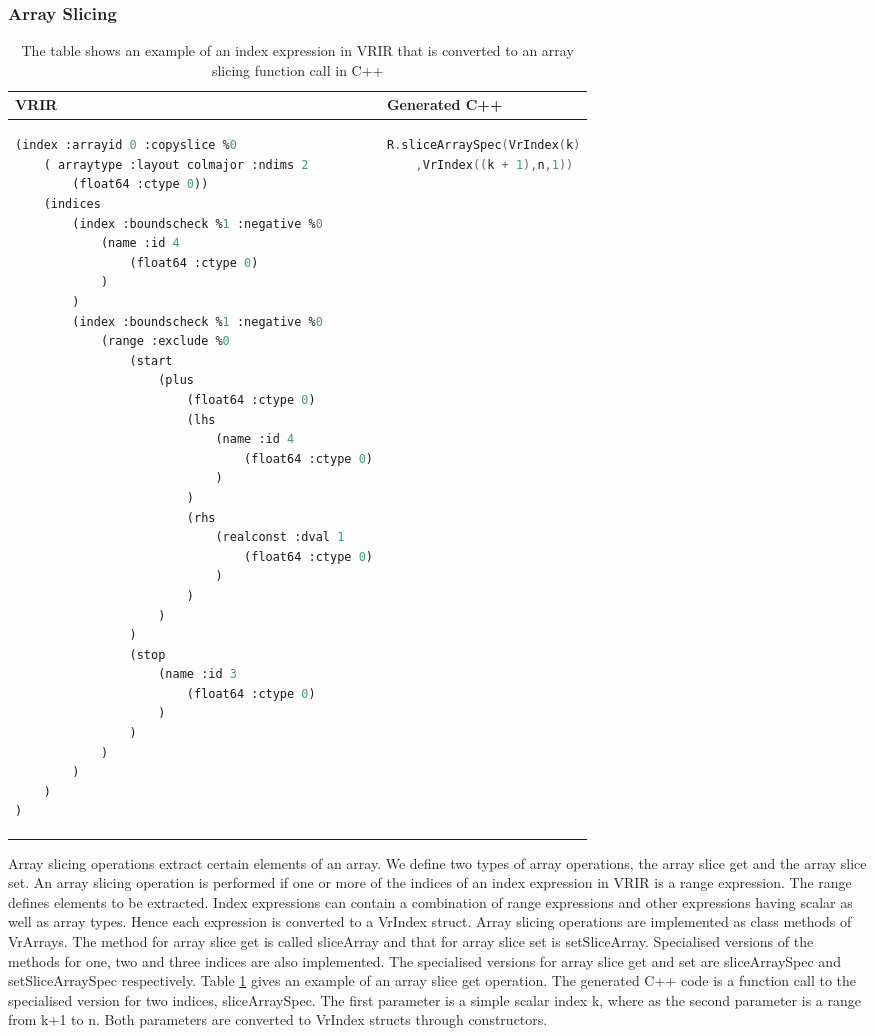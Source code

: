 \subsubsection{Array Slicing}
\label{subsubsec:slicing}
\begin{table}[htbp]
\centering
\begin{tabular}{|l|l|}
\hline

VRIR &  Generated C++ \\
\hline
{
\begin{lstlisting}[language=lisp,frame=none, numbers=none]
(index :arrayid 0 :copyslice %0
	( arraytype :layout colmajor :ndims 2
		(float64 :ctype 0))
	(indices
		(index :boundscheck %1 :negative %0
			(name :id 4
				(float64 :ctype 0)
			)
		)
		(index :boundscheck %1 :negative %0
			(range :exclude %0
				(start
					(plus
						(float64 :ctype 0)
						(lhs
							(name :id 4
								(float64 :ctype 0)
							)
						)
						(rhs
							(realconst :dval 1
								(float64 :ctype 0)
							)
						)
					)
				)
				(stop
					(name :id 3
						(float64 :ctype 0)
					)
				)
			)
		)
	)
)
\end{lstlisting}
}
&
{
\begin{lstlisting}[language=c,frame=none, numbers=none]
R.sliceArraySpec(VrIndex(k)
	,VrIndex((k + 1),n,1))
\end{lstlisting}
} \\
\hline
\end{tabular}
\caption[Array slicing example]{The table shows an example of an index expression in VRIR that is converted to an array slicing function call in C++}
\label{tab:sliceIndex}
\end{table}
Array slicing operations extract certain elements of an array. We define two types of array operations, the array slice get and the array slice set. An array slicing operation is performed if one or more of the indices of an index expression in VRIR is a range expression. The range defines elements to be extracted. Index expressions can contain a combination of range expressions and other expressions having scalar as well as array types. Hence each expression is converted to a VrIndex struct. Array slicing operations are implemented as class methods of VrArrays. The method for array slice get is called sliceArray and that for array slice set is setSliceArray. Specialised versions of the methods for one, two and three indices are also implemented. The specialised versions for array slice get and set are sliceArraySpec and setSliceArraySpec respectively. Table \ref{tab:sliceIndex} gives an example of an array slice get operation. The generated C++ code is a function call to the specialised version for two indices, sliceArraySpec. The first parameter is a simple scalar index k, where as the second parameter is a range from k+1 to n. Both parameters are converted to VrIndex structs through constructors.
